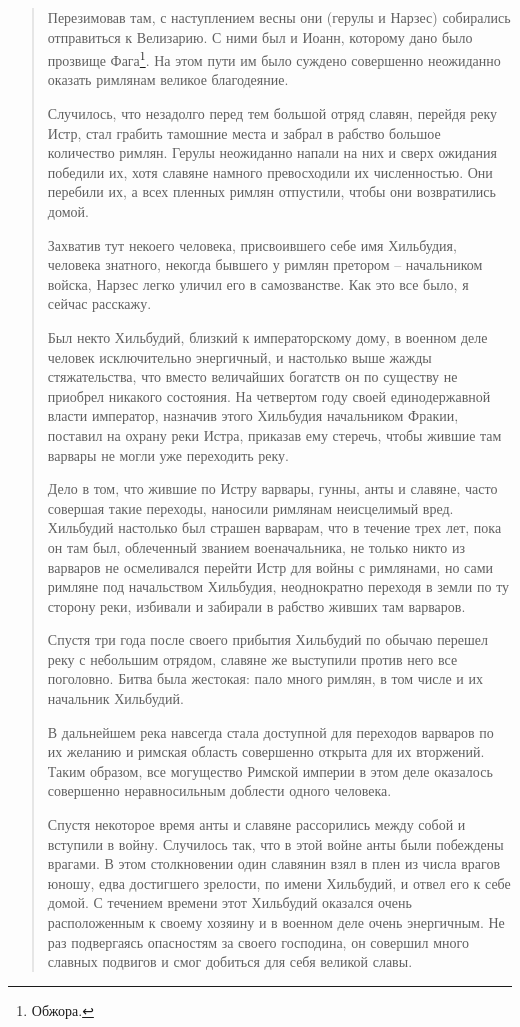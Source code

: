 \begin{quotation}
Перезимовав там, с наступлением весны они (герулы и Нарзес) собирались отправиться к Велизарию. С ними был и Иоанн, которому дано было прозвище Фага\footnote{Обжора.}. На этом пути им было суждено совершенно неожиданно оказать римлянам великое благодеяние.

Случилось, что незадолго перед тем большой отряд славян, перейдя реку Истр, стал грабить тамошние места и забрал в рабство большое количество римлян. Герулы неожиданно напали на них и сверх ожидания победили их, хотя славяне намного превосходили их численностью. Они перебили их, а всех пленных римлян отпустили, чтобы они возвратились домой.

Захватив тут некоего человека, присвоившего себе имя Хильбудия, человека знатного, некогда бывшего у римлян претором – начальником войска, Нарзес легко уличил его в самозванстве. Как это все было, я сейчас расскажу.

Был некто Хильбудий, близкий к императорскому дому, в военном деле человек исключительно энергичный, и настолько выше жажды стяжательства, что вместо величайших богатств он по существу не приобрел никакого состояния. На четвертом году своей единодержавной власти император, назначив этого Хильбудия начальником Фракии, поставил на охрану реки Истра, приказав ему стеречь, чтобы жившие там варвары не могли уже переходить реку. 

Дело в том, что жившие по Истру варвары, гунны, анты и славяне, часто совершая такие переходы, наносили римлянам неисцелимый вред. Хильбудий настолько был страшен варварам, что в течение трех лет, пока он там был, облеченный званием военачальника, не только никто из варваров не осмеливался перейти Истр для войны с римлянами, но сами римляне под начальством Хильбудия, неоднократно переходя в земли по ту сторону реки, избивали и забирали в рабство живших там варваров.

Спустя три года после своего прибытия Хильбудий по обычаю перешел реку с небольшим отрядом, славяне же выступили против него все поголовно. Битва была жестокая: пало много римлян, в том числе и их начальник Хильбудий. 

В дальнейшем река навсегда стала доступной для переходов варваров по их желанию и римская область совершенно открыта для их вторжений. Таким образом, все могущество Римской империи в этом деле оказалось совершенно неравносильным доблести одного человека.

Спустя некоторое время анты и славяне рас\-сорились между собой и вступили в войну. Случилось так, что в этой войне анты были побеждены врагами. В этом столкновении один славянин взял в плен из числа врагов юношу, едва достигшего зрелости, по имени Хильбудий, и отвел его к себе домой. С течением времени этот Хильбудий оказался очень расположенным к своему хозяину и в военном деле очень энергичным. Не раз подвергаясь опасностям за своего господина, он совершил много славных подвигов и смог добиться для себя великой славы.


\end{quotation}
